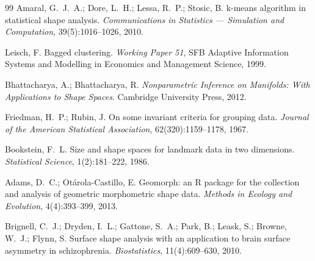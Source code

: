 \documentclass[brazilian,11pt]{beamer}
\begin{document}
\begin{frame}[allowframebreaks]
\begin{thebibliography}{99}
        Amaral, G.\ J.\ A.; Dore, L.\ H.; Lessa, R.\ P.; Stosic, B.
        k-means algorithm in statistical shape analysis.
        \textit{Communications in Statistics --- Simulation and Computation}, 39(5):1016--1026, 2010.

        Leisch, F.
        Bagged clustering.
        \textit{Working Paper 51}, SFB Adaptive Information Systems and Modelling in Economics and Management Science, 1999.

        Bhattacharya, A.; Bhattacharya, R.
        \textit{Nonparametric Inference on Manifolds: With Applications to Shape Spaces}.
        Cambridge University Press, 2012.

        Friedman, H.\ P.; Rubin, J.
        On some invariant criteria for grouping data.
        \textit{Journal of the American Statistical Association}, 62(320):1159--1178, 1967.

        Bookstein, F.\ L.
        Size and shape spaces for landmark data in two dimensions.
        \textit{Statistical Science}, 1(2):181--222, 1986.

        Adams, D.\ C.; Otárola-Castillo, E.
        Geomorph: an R package for the collection and analysis of geometric morphometric shape data.
        \textit{Methods in Ecology and Evolution}, 4(4):393--399, 2013.

        Brignell, C.\ J.; Dryden, I.\ L.; Gattone, S.\ A.; Park, B.; Leask, S.; Browne, W.\ J.; Flynn, S.
        Surface shape analysis with an application to brain surface asymmetry in schizophrenia.
        \textit{Biostatistics}, 11(4):609--630, 2010.
    \end{thebibliography}
\end{frame}
\end{document}
